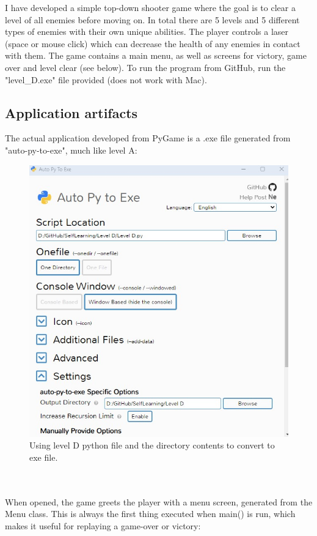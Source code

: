 \documentclass[a4paper, 11pt]{report}
\begin{document}
I have developed a simple top-down shooter game where the goal is to clear a level of all enemies before moving on. In total there are 5 levels and 5 different types of enemies with their own unique abilities. The player controls a laser (space or mouse click) which can decrease the health of any enemies in contact with them. The game contains a main menu, as well as screens for victory, game over and level clear (see below). To run the program from GitHub, run the "level\_D.exe" file provided (does not work with Mac).

\subsection{Application artifacts}

The actual application developed from PyGame is a .exe file generated from "auto-py-to-exe", much like level A:
\begin{figure}[h]
    \centering
    \includegraphics[width=\textwidth]{auto-py-to-exe}
    \caption{Using level D python file and the directory contents to convert to exe file.}
\end{figure}
\\\\
When opened, the game greets the player with a menu screen, generated from the Menu class. This is always the first thing executed when main() is run, which makes it useful for replaying a game-over or victory:
\end{document}
